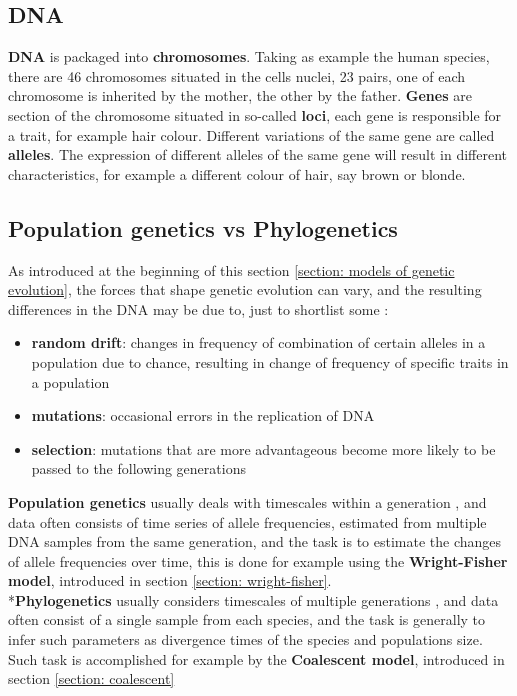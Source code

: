 \documentclass[12pt,mythesisstyle]{report}
\begin{document}
\subsection{DNA}
\textbf{DNA} is packaged into \textbf{chromosomes}. Taking as example the human species, there are 46 chromosomes situated in the cells nuclei, 23 pairs, one of each chromosome is inherited by the mother, the other by the father. \textbf{Genes} are section of the chromosome situated in so-called \textbf{loci}, each gene is responsible for a trait, for example hair colour. Different variations of the same gene are called \textbf{alleles}. The expression of different alleles of the same gene will result in different characteristics, for example a different colour of hair, say brown or blonde.

\subsection{Population genetics vs Phylogenetics}\label{section: genetics vs phylogenesis}
As introduced at the beginning of this section \ref{section: models of genetic evolution}, the forces that shape genetic evolution can vary, and the resulting differences in the DNA may be due to, just to shortlist some  \cite{wrightexplained}:
\begin{itemize}
	\item \textbf{random drift}: changes in frequency of combination of certain alleles in a population due to chance, resulting in change of frequency of specific traits in a population
	\item \textbf{mutations}: occasional errors in the replication of DNA
	\item \textbf{selection}: mutations that are more advantageous become more likely to be passed to the following generations
\end{itemize}
\textbf{Population genetics} usually deals with timescales within a generation \cite{wrightexplained}, and data often consists of time series of allele frequencies, estimated from multiple DNA samples from the same generation, and the task is to estimate the changes of allele frequencies over time, this is done for example using the \textbf{Wright-Fisher model}, introduced in section \ref{section: wright-fisher}.
\\*\textbf{Phylogenetics} usually considers timescales of multiple generations \cite{wrightexplained}, and data often consist of a single sample from each species, and the task is generally to infer such parameters as divergence times of the species and populations size. Such task is accomplished for example by the \textbf{Coalescent model}, introduced in section \ref{section: coalescent}
\end{document}
